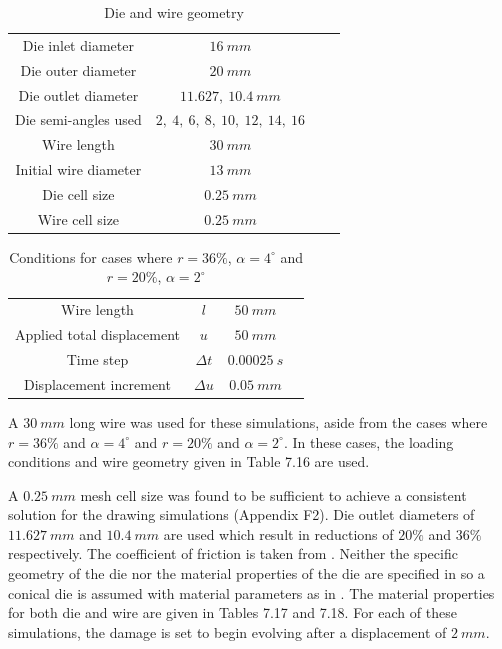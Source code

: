 \documentclass[sn-mathphys,Numbered,draft]{sn-jnl}%
\begin{document}
\begin{table}[htb]
	\centering
		\begin{tabular}{cccc} \hline
		    Die inlet diameter & $16\ mm$ \\
		    Die outer diameter & $20\ mm$ \\
      	Die outlet diameter & $11.627,\ 10.4\ mm$ \\
            Die semi-angles used &  $2,\ 4,\ 6,\ 8,\ 10,\ 12,\ 14,\ 16$ \\
		    Wire length & $30\ mm$ \\
		    Initial wire diameter & $13\ mm$ \\
      	Die cell size & $0.25\ mm$ \\
            Wire cell size & $0.25\ mm$ \\
			\hline
		\end{tabular}
	\caption{Die and wire geometry}
	\label{tab:material_properties}
\end{table}


\begin{table}[htb]
	\centering
		\begin{tabular}{cccc} \hline
      	Wire length & $l$ & $50\ mm$ \\
		    Applied total displacement & $u$ & $50\ mm$ \\
		    Time step & $\Delta t$ & $0.00025\ s$ \\
			Displacement increment  & $\Delta u$ & $0.05\ mm$   \\
			\hline
		\end{tabular}
	\caption{Conditions for cases where $r=36\%$, $\alpha=4^{\circ}$ and $r=20\%$, $\alpha=2^{\circ}$} 
	\label{tab:material_properties}
\end{table}

A $30\ mm$ long wire was used for these simulations, aside from the cases where $r=36\%$ and $\alpha=4^{\circ}$ and $r=20\%$ and $\alpha=2^{\circ}$. In these cases, the loading conditions and wire geometry given in Table 7.16 are used.

A $0.25\ mm$ mesh cell size was found to be sufficient to achieve a consistent solution for the drawing simulations (Appendix F2). Die outlet diameters of $11.627\ mm$ and  $10.4\ mm$ are used which result in reductions of $20\%$ and $36\%$ respectively. The coefficient of friction is taken from \citet{roh_process_2021}. Neither the specific geometry of the die nor the material properties of the die are specified in \citet{roh_process_2021} so a conical die is assumed with material parameters as in \citet{clancy_improving_2019}. The material properties for both die and wire are given in Tables 7.17 and 7.18. For each of these simulations, the damage is set to begin evolving after a displacement of $2\ mm$.
\end{document}
